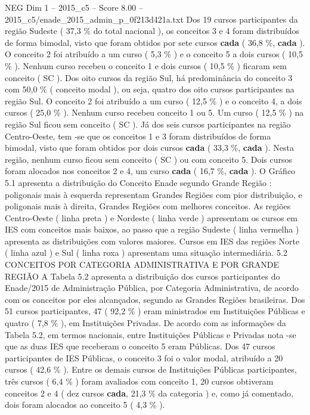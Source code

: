 \begin{textsample}{NEG Dim 1 – 2015\_c5 – Score 8.00 – 2015\_c5/enade\_2015\_admin\_p\_0f213d421a.txt}
Dos 19 cursos participantes da região Sudeste ( 37,3 \% do total nacional ), os conceitos 3 e 4 foram distribuídos de forma bimodal, visto que foram obtidos por sete cursos \textbf{cada} ( 36,8 \%, \textbf{cada} ).
O conceito 2 foi atribuído a um curso ( 5,3 \% ) e o conceito 5 a dois cursos ( 10,5 \% ).
Nenhum curso recebeu o conceito 1 e dois cursos ( 10,5 \% ) ficaram sem conceito ( SC ).
Dos oito cursos da região Sul, há predominância do conceito 3 com 50,0 \% ( conceito modal ), ou seja, quatro dos oito cursos participantes na região Sul.
O conceito 2 foi atribuído a um curso ( 12,5 \% ) e o conceito 4, a dois cursos ( 25,0 \% ).
Nenhum curso recebeu conceito 1 ou 5.
Um curso ( 12,5 \% ) na região Sul ficou sem conceito ( SC ).
Já dos seis cursos participantes na região Centro-Oeste, tem -se que os conceitos 1 e 3 foram distribuídos de forma bimodal, visto que foram obtidos por dois cursos \textbf{cada} ( 33,3 \%, \textbf{cada} ).
Nesta região, nenhum curso ficou sem conceito ( SC ) ou com conceito 5.
Dois cursos foram alocados nos conceitos 2 e 4, um curso \textbf{cada} ( 16,7 \%, \textbf{cada} ).
O Gráfico 5.1 apresenta a distribuição do Conceito Enade segundo Grande Região : poligonais mais à esquerda representam Grandes Regiões com pior distribuição, e poligonais mais à direita, Grandes Regiões com melhores conceitos.
As regiões Centro-Oeste ( linha preta ) e Nordeste ( linha verde ) apresentam os cursos em IES com conceitos mais baixos, ao passo que a região Sudeste ( linha vermelha ) apresenta as distribuições com valores maiores.
Cursos em IES das regiões Norte ( linha azul ) e Sul ( linha roxa ) apresentam uma situação intermediária. 5.2 CONCEITOS POR CATEGORIA ADMINISTRATIVA E POR GRANDE REGIÃO A Tabela 5.2 apresenta a distribuição dos cursos participantes do Enade/2015 de Administração Pública, por Categoria Administrativa, de acordo com os conceitos por eles alcançados, segundo as Grandes Regiões brasileiras.
Dos 51 cursos participantes, 47 ( 92,2 \% ) eram ministrados em Instituições Públicas e quatro ( 7,8 \% ), em Instituições Privadas.
De acordo com as informações da Tabela 5.2, em termos nacionais, entre Instituições Públicas e Privadas nota -se que as duas IES que receberam o conceito 5 eram Públicas.
Dos 47 cursos participantes de IES Públicas, o conceito 3 foi o valor modal, atribuído a 20 cursos ( 42,6 \% ).
Entre os demais cursos de Instituições Públicas participantes, três cursos ( 6,4 \% ) foram avaliados com conceito 1, 20 cursos obtiveram conceitos 2 e 4 ( dez cursos \textbf{cada}, 21,3 \% da categoria ) e, como já comentado, dois foram alocados ao conceito 5 ( 4,3 \% ).

\end{textsample}

